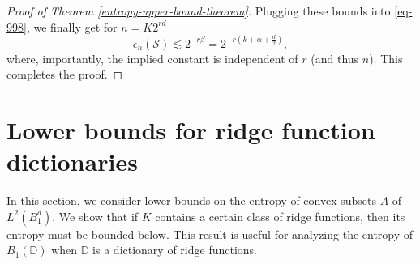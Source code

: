 \begin{proof}[Proof of Theorem \ref{entropy-upper-bound-theorem}]
Plugging these bounds into \eqref{eq-998}, we finally get for $n=K2^{rd}$
\begin{equation}
 \epsilon_n(\mathcal{S}) \lesssim 2^{-r\beta} = 2^{-r\left(k+\alpha+\frac{d}{2}\right)},
\end{equation}
where, importantly, the implied constant is independent of $r$ (and thus $n$). This completes the proof.
\end{proof}

\section{Lower bounds for ridge function dictionaries}\label{main-result-2-section}
In this section, we consider lower bounds on the entropy of convex subsets $A$ of $L^2(B_1^d)$. We show that if $K$ contains a certain class of ridge functions, then its entropy must be bounded below. This result is useful for analyzing the entropy of $B_1(\mathbb{D})$ when $\mathbb{D}$ is a dictionary of ridge functions.

